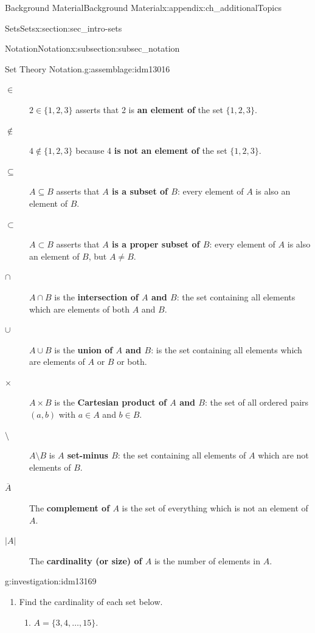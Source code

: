 \documentclass[oneside,10pt,]{book}
\newcommand{\terminology}[1]{\textbf{#1}}
\numberwithin{equation}{chapter}
\newcommand{\card}[1]{\left| #1 \right|}
\begin{document}
\begin{appendixptx}{Background Material}{}{Background Material}{}{}{x:appendix:ch_additionalTopics}
\begin{sectionptx}{Sets}{}{Sets}{}{}{x:section:sec_intro-sets}
\begin{subsectionptx}{Notation}{}{Notation}{}{}{x:subsection:subsec_notation}
\begin{assemblage}{Set Theory Notation.}{g:assemblage:idm13016}
\begin{description}
\item[{\(\in\)}]\(2 \in \{1,2,3\}\) asserts that 2 is \terminology{an element of} the set \(\{1,2,3\}\). \label{g:notation:idm13048}%
\item[{\(\not\in\)}]\(4 \notin \{1,2,3\}\) because 4 \terminology{is not an element of} the set \(\{1,2,3\}\).%
\item[{\(\subseteq\)}]\(A \subseteq B\) asserts that \terminology{\(A\) is a subset of \(B\)}: every element of \(A\) is also an element of \(B\).      \label{g:notation:idm13069}%
\item[{\(\subset\)}]\(A \subset B\) asserts that  \terminology{\(A\) is a proper subset of \(B\)}: every element of \(A\) is also an element of \(B\), but \(A \ne B\).\label{g:notation:idm13084}%
\item[{\(\cap\)}]\(A \cap B\) is the \terminology{intersection of \(A\) and \(B\)}: the set containing all elements which are elements of both \(A\) and \(B\). \label{g:notation:idm13098}%
\item[{\(\cup\)}]\(A \cup B\) is the \terminology{union of \(A\) and \(B\)}: is the set containing all elements which are elements of \(A\) or \(B\) or both.\label{g:notation:idm13113}%
\item[{\(\times\)}]\(A \times B\) is the \terminology{Cartesian product of \(A\) and   \(B\)}: the set of all ordered pairs \((a,b)\) with \(a \in A\) and \(b \in B\).\label{g:notation:idm13129}%
\item[{\(\setminus\)}]\(A \setminus B\) is \terminology{\(A\) set-minus \(B\)}: the set containing all elements of \(A\) which are not elements of \(B\).\label{g:notation:idm13142}%
\item[{\(\overline{A}\)}]The \terminology{complement of \(A\)} is the set of everything which is not an element of \(A\). \label{g:notation:idm13152}%
\item[{\(\card{A}\)}]The \terminology{cardinality (or size) of \(A\)} is the number of elements in \(A\).\label{g:notation:idm13163} %
\end{description}
%
\end{assemblage}
\begin{investigation}{}{g:investigation:idm13169}%
%
\begin{enumerate}
\item{}Find the cardinality of each set below.%
\begin{enumerate}
\item{}\(A = \{3,4,\ldots, 15\}\).%

\end{enumerate}
\end{enumerate}
\end{investigation}
\end{subsectionptx}
\end{sectionptx}
\end{appendixptx}
\end{document}
